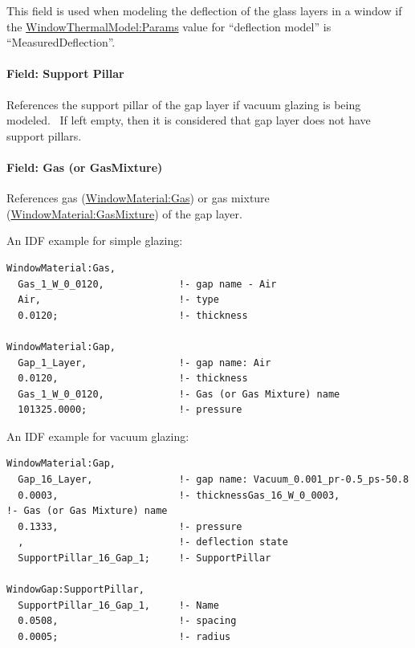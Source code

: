 This field is used when modeling the deflection of the glass layers in a window if the \hyperref[windowthermalmodelparams]{WindowThermalModel:Params} value for ``deflection model'' is ``MeasuredDeflection''.

\paragraph{Field: Support Pillar}\label{field-support-pillar}

References the support pillar of the gap layer if vacuum glazing is being modeled.~ If left empty, then it is considered that gap layer does not have support pillars.

\paragraph{Field: Gas (or GasMixture)}\label{field-gas-or-gasmixture}

References gas (\hyperref[windowmaterialgas]{WindowMaterial:Gas}) or gas mixture (\hyperref[windowmaterialgasmixture]{WindowMaterial:GasMixture}) of the gap layer.

An IDF example for simple glazing:

\begin{lstlisting}
WindowMaterial:Gas,
  Gas_1_W_0_0120,             !- gap name - Air
  Air,                        !- type
  0.0120;                     !- thickness

WindowMaterial:Gap,
  Gap_1_Layer,                !- gap name: Air
  0.0120,                     !- thickness
  Gas_1_W_0_0120,             !- Gas (or Gas Mixture) name
  101325.0000;                !- pressure
\end{lstlisting}

An IDF example for vacuum glazing:

\begin{lstlisting}
WindowMaterial:Gap,
  Gap_16_Layer,               !- gap name: Vacuum_0.001_pr-0.5_ps-50.8
  0.0003,                     !- thicknessGas_16_W_0_0003,                                    !- Gas (or Gas Mixture) name
  0.1333,                     !- pressure
  ,                           !- deflection state
  SupportPillar_16_Gap_1;     !- SupportPillar

WindowGap:SupportPillar,
  SupportPillar_16_Gap_1,     !- Name
  0.0508,                     !- spacing
  0.0005;                     !- radius
\end{lstlisting}


